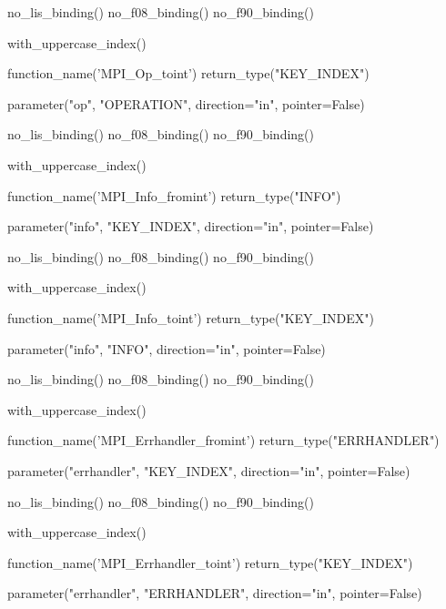 %
\begin{mpi-binding}
    no_lis_binding()
    no_f08_binding()
    no_f90_binding()

    with_uppercase_index()

    function_name('MPI_Op_toint')
    return_type("KEY_INDEX")

    parameter("op", "OPERATION", direction="in", pointer=False)
\end{mpi-binding}

%
\begin{mpi-binding}
    no_lis_binding()
    no_f08_binding()
    no_f90_binding()

    with_uppercase_index()

    function_name('MPI_Info_fromint')
    return_type("INFO")

    parameter("info", "KEY_INDEX", direction="in", pointer=False)
\end{mpi-binding}

%
\begin{mpi-binding}
    no_lis_binding()
    no_f08_binding()
    no_f90_binding()

    with_uppercase_index()

    function_name('MPI_Info_toint')
    return_type("KEY_INDEX")

    parameter("info", "INFO", direction="in", pointer=False)
\end{mpi-binding}

%
\begin{mpi-binding}
    no_lis_binding()
    no_f08_binding()
    no_f90_binding()

    with_uppercase_index()

    function_name('MPI_Errhandler_fromint')
    return_type("ERRHANDLER")

    parameter("errhandler", "KEY_INDEX", direction="in", pointer=False)
\end{mpi-binding}

%
\begin{mpi-binding}
    no_lis_binding()
    no_f08_binding()
    no_f90_binding()

    with_uppercase_index()

    function_name('MPI_Errhandler_toint')
    return_type("KEY_INDEX")

    parameter("errhandler", "ERRHANDLER", direction="in", pointer=False)
\end{mpi-binding}


